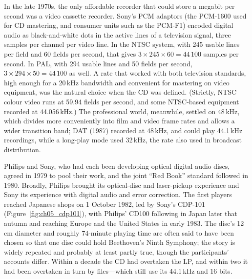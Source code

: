 \begin{history}
In the late 1970s, the only affordable recorder that could store a megabit per second was a video
cassette recorder. Sony's PCM adaptors (the PCM-1600 used for CD mastering, and consumer units such
as the PCM-F1) encoded digital audio as black-and-white dots in the active lines of a television
signal, three samples per channel per video line. In the NTSC system, with 245 usable lines per field
and 60 fields per second, that gives $3\times245\times60=44\,100$ samples per second. In PAL, with
294 usable lines and 50 fields per second, $3\times294\times50=44\,100$ as well. A rate that worked
with both television standards, high enough for a 20\,kHz bandwidth and convenient for mastering
on video equipment, was the natural choice when the CD was defined. (Strictly, NTSC colour video runs
at 59.94 fields per second, and some NTSC-based equipment recorded at 44.056\,kHz.) The professional
world, meanwhile, settled on 48\,kHz, which divides more conveniently into film and video frame rates
and allows a wider transition band; DAT (1987) recorded at 48\,kHz, and could play 44.1\,kHz
recordings, while a long-play mode used 32\,kHz, the rate also used in broadcast distribution.
\end{history}


\begin{history}
Philips and Sony, who had each been developing optical digital audio discs, agreed in 1979 to
pool their work, and the joint ``Red Book'' standard followed in 1980. Broadly, Philips brought
its optical-disc and laser-pickup experience and Sony its experience with digital audio and error
correction. The first players reached Japanese shops on 1 October
1982, led by Sony's CDP-101 (Figure~\ref{fig:ch05_cdp101}), with Philips' CD100 following in Japan
later that autumn and reaching Europe and the United States in early 1983. The disc's 12\,cm diameter and roughly 74-minute playing time are often said to have
been chosen so that one disc could hold Beethoven's Ninth Symphony; the story is widely repeated
and probably at least partly true, though the participants' accounts differ. Within a decade the
CD had overtaken the LP, and within two it had been overtaken in turn by files---which still use
its 44.1\,kHz and 16 bits.
\end{history}

